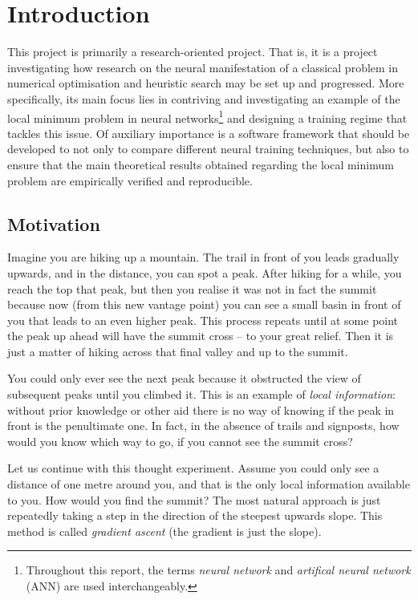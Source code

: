 \chapter{Introduction}

This project is primarily a research-oriented project. 
That is, it is a project investigating how research on the neural manifestation of a classical problem in numerical optimisation and heuristic search may be set up and progressed.
More specifically, its main focus lies in contriving and investigating an example of the local minimum problem in neural networks\footnote{Throughout this report, the terms \textit{neural network} and \textit{artifical neural network} (ANN) are used interchangeably.} and designing a training regime that tackles this issue. 
Of auxiliary importance is a software framework that should be developed to not only to compare different neural training techniques, but also to ensure that the main theoretical results obtained regarding the local minimum problem are empirically verified and reproducible.

\section{Motivation}
Imagine you are hiking up a mountain.
The trail in front of you leads gradually upwards, and in the distance, you can spot a peak.
After hiking for a while, you reach the top that peak, but then you realise it was not in fact the summit because now (from this new vantage point) you can see a small basin in front of you that leads to an even higher peak. 
This process repeats until at some point the peak up ahead will have the summit cross -- to your great relief. 
Then it is just a matter of hiking across that final valley and up to the summit.

You could only ever see the next peak because it obstructed the view of subsequent peaks until you climbed it.
This is an example of \textit{local information}: without prior knowledge or other aid there is no way of knowing if the peak in front is the penultimate one.
In fact, in the absence of trails and signposts, how would you know which way to go, if you cannot see the summit cross?

Let us continue with this thought experiment. 
Assume you could only see a distance of one metre around you, and that is the only local information available to you.
How would you find the summit?
The most natural approach is just repeatedly taking a step in the direction of the steepest upwards slope.
This method is called \textit{gradient ascent} (the gradient is just the slope).

